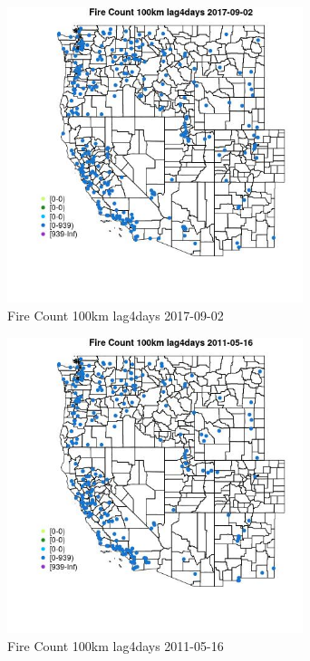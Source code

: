 \begin{figure} 
\centering  
\includegraphics[width=0.77\textwidth]{Code_Outputs/Report_ML_input_PM25_Step4_part_e_de_duplicated_aves_compiled_2019-05-20wNAs_MapObsFire_Count_100km_lag4days2017-09-02.jpg} 
\caption{\label{fig:Report_ML_input_PM25_Step4_part_e_de_duplicated_aves_compiled_2019-05-20wNAsMapObsFire_Count_100km_lag4days2017-09-02}Fire Count 100km lag4days 2017-09-02} 
\end{figure} 
 

\begin{figure} 
\centering  
\includegraphics[width=0.77\textwidth]{Code_Outputs/Report_ML_input_PM25_Step4_part_e_de_duplicated_aves_compiled_2019-05-20wNAs_MapObsFire_Count_100km_lag4days2011-05-16.jpg} 
\caption{\label{fig:Report_ML_input_PM25_Step4_part_e_de_duplicated_aves_compiled_2019-05-20wNAsMapObsFire_Count_100km_lag4days2011-05-16}Fire Count 100km lag4days 2011-05-16} 
\end{figure} 
 

